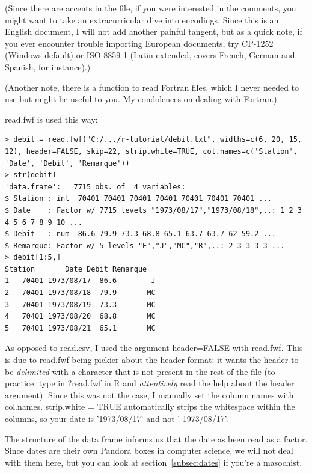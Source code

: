 \documentclass{report}
\newcommand{\code}[1]{\textsf{\ttfamily #1}}
\begin{document}
		(Since there are accents in the file, if you were interested in the comments, you might want to take an extracurricular dive into encodings. Since this is an English document, I will not add another painful tangent, but as a quick note, if you ever encounter trouble importing European documents, try CP-1252 (Windows default) or ISO-8859-1 (Latin extended, covers French, German and Spanish, for instance).)
		
		(Another note, there is a function to read Fortran files, which I never needed to use but might be useful to you. My condolences on dealing with Fortran.)
		
		\code{read.fwf} is used this way:
		\begin{verbatim}
> debit = read.fwf("C:/.../r-tutorial/debit.txt", widths=c(6, 20, 15, 12), header=FALSE, skip=22, strip.white=TRUE, col.names=c('Station', 'Date', 'Debit', 'Remarque'))
> str(debit)
'data.frame':   7715 obs. of  4 variables:
$ Station : int  70401 70401 70401 70401 70401 70401 70401 ...
$ Date    : Factor w/ 7715 levels "1973/08/17","1973/08/18",..: 1 2 3 4 5 6 7 8 9 10 ...
$ Debit   : num  86.6 79.9 73.3 68.8 65.1 63.7 63.7 62 59.2 ...
$ Remarque: Factor w/ 5 levels "E","J","MC","R",..: 2 3 3 3 3 ...
> debit[1:5,]
Station       Date Debit Remarque
1   70401 1973/08/17  86.6        J
2   70401 1973/08/18  79.9       MC
3   70401 1973/08/19  73.3       MC
4   70401 1973/08/20  68.8       MC
5   70401 1973/08/21  65.1       MC
		\end{verbatim}
		
		As opposed to \code{read.csv}, I used the argument \code{header=FALSE} with \code{read.fwf}. This is due to \code{read.fwf} being pickier about the header format: it wants the header to be \emph{delimited} with a character that is not present in the rest of the file (to practice, type in \code{?read.fwf} in R and \emph{attentively} read the help about the \code{header} argument). Since this was not the case, I manually set the column names with \code{col.names}. \code{strip.white = TRUE} automatically strips the whitespace within the columns, so your date is '1973/08/17' and not '         1973/08/17'.
		
		The structure of the data frame informs us that the date as been read as a factor. Since dates are their own Pandora boxes in computer science, we will not deal with them here, but you can look at section~\ref{subsec:dates} if you're a masochist.
		
\end{document}
